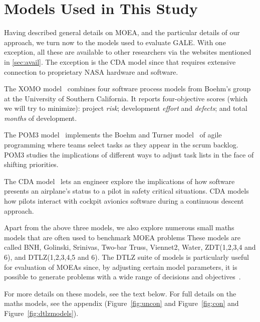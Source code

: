 \documentclass[10pt,journal,compsoc]{IEEEtran}
\newcommand{\tion}[1]{\textsection\ref{sec:#1}}
\newcommand{\fig}[1]{Figure~\ref{fig:#1}}
\newenvironment{changed}{\par}{\par}
\newcommand{\addit}[1]{\begin{changed}\end{changed}}
\begin{document}
\begin{changed}
\addit{cocont}

\section{Models Used in This Study}\label{sec:models}
Having described general details on MOEA, and the particular details of our approach, we turn now to the models used to evaluate GALE.
With one exception, all these  are available to other researchers via the websites mentioned in \tion{avail}. 
The exception is the CDA model since that requires extensive connection to proprietary NASA hardware and software.

The XOMO model~\cite{me07f,me09a,me09e} combines four software process models from Boehm’s group at the University of Southern California.
It reports four-objective scores (which we will try to minimize): project {\em risk}; development {\em effort} and {\em defects}; and total {\em months} of development.

The POM3 model~\cite{port08,me09j}  implements the Boehm and Turner model~\cite{port08,1204376,turner03} of agile programming where teams select tasks as they appear in the scrum backlog.
POM3 studies the implications of different ways to adjust task lists in the face of shifting priorities.



The CDA model~\cite{Kim2011,Pritchett2011,Feigh2012,Kim2013,Pritchett2013} lets an engineer explore the implications of how software presents an airplane's status to a pilot in safety critical situations. 
CDA models how pilots interact with cockpit avionics software during a continuous descent approach.

Apart from the above three models, we also explore numerous small maths models that are often used to benchmark MOEA problems 
These models are called BNH, Golinski, Srinivas, Two-bar Truss, Viennet2, Water, ZDT(1,2,3,4 and 6), and DTLZ(1,2,3,4,5 and 6).
The  DTLZ suite of models is particularly useful for evaluation of MOEAs since, by adjusting certain model  parameters, it is possible to generate problems with a wide range of decisions and objectives~\cite{Zitzler2000zdtpaper,dtlz2001a}.

For more details on these models, see the text below.
For full details on the maths models, see the appendix (\fig{uncon} and \fig{con} and \fig{dtlzmodels}).





\addit{xomo}

\addit{xomocases}

\end{changed}
\end{document}
